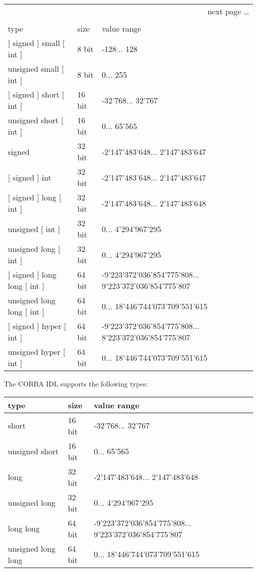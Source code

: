 \begin{center}
\begin{longtable}{|l|l|p{6cm}|}%
  \multicolumn{3}{r}{next page \dots}\\\endfoot%
  \multicolumn{3}{l}{\dots continued from last page}\\\endhead%
  \endfirsthead%
  \endlastfoot%
  \hline
type & size & value range \\ \hline
$[$ signed $]$ small $[$ int $]$ & 8 bit & -128... 128 \\
unsigned small $[$ int $]$ & 8 bit & 0... 255 \\ 
$[$ signed $]$ short $[$ int $]$ & 16 bit & -32'768... 32'767 \\
unsigned short $[$ int $]$ & 16 bit & 0... 65'565 \\
signed & 32 bit & -2'147'483'648... 2'147'483'647 \\
$[$ signed $]$ int & 32 bit & -2'147'483'648... 2'147'483'647 \\
$[$ signed $]$ long $[$ int $]$ & 32 bit & -2'147'483'648... 2'147'483'648 \\
unsigned $[$ int $]$ & 32 bit & 0... 4'294'967'295 \\
unsigned long $[$ int $]$ & 32 bit & 0... 4'294'967'295 \\
$[$ signed $]$ long long $[$ int $]$ & 64 bit & -9'223'372'036'854'775'808... 9'223'372'036'854'775'807 \\
unsigned long long $[$ int $]$ & 64 bit & 0... 18'446'744'073'709'551'615 \\
$[$ signed $]$ hyper $[$ int $]$ & 64 bit & -9'223'372'036'854'775'808... 8'223'372'036'854'775'807 \\
unsigned hyper $[$ int $]$ & 64 bit & 0... 18'446'744'073'709'551'615 \\
\hline
\end{longtable}
\end{center}

The CORBA IDL supports the following types:

\begin{center}
\begin{tabular}{|l|l|p{5cm}|}
\hline
type & size & value range \\ \hline
short & 16 bit & -32'768... 32'767 \\
unsigned short & 16 bit & 0... 65'565 \\
long & 32 bit & -2'147'483'648... 2'147'483'648 \\
unsigned long & 32 bit & 0... 4'294'967'295 \\
long long & 64 bit & -9'223'372'036'854'775'808... 9'223'372'036'854'775'807 \\
unsigned long long & 64 bit & 0... 18'446'744'073'709'551'615 \\
\hline
\end{tabular}
\end{center}

